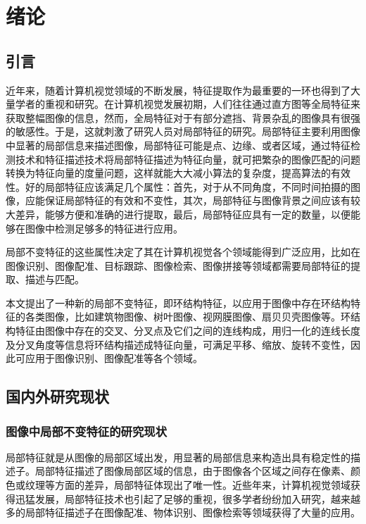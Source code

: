 

\chapter{绪论}
\label{cha:intro}


\section{引言}
\label{}

近年来，随着计算机视觉领域的不断发展，特征提取作为最重要的一环也得到了大量学者的重视和研究\cite{shipeng}。在计算机视觉发展初期，人们往往通过直方图等全局特征来获取整幅图像的信息\cite{liuying}，然而，全局特征对于有部分遮挡、背景杂乱的图像具有很强的敏感性。于是，这就刺激了研究人员对局部特征的研究。局部特征主要利用图像中显著的局部信息来描述图像，局部特征可能是点、边缘、或者区域，通过特征检测技术和特征描述技术将局部特征描述为特征向量，就可把繁杂的图像匹配的问题转换为特征向量的度量问题，这样就能大大减小算法的复杂度，提高算法的有效性。好的局部特征应该满足几个属性：首先，对于从不同角度，不同时间拍摄的图像，应能保证局部特征的有效和不变性，其次，局部特征与图像背景之间应该有较大差异，能够方便和准确的进行提取，最后，局部特征应具有一定的数量，以便能够在图像中检测足够多的特征进行应用。

局部不变特征的这些属性决定了其在计算机视觉各个领域能得到广泛应用，比如在图像识别、图像配准、目标跟踪、图像检索、图像拼接等领域都需要局部特征的提取、描述与匹配。

本文提出了一种新的局部不变特征，即环结构特征，以应用于图像中存在环结构特征的各类图像，比如建筑物图像、树叶图像、视网膜图像、扇贝贝壳图像等。环结构特征由图像中存在的交叉、分叉点及它们之间的连线构成，用归一化的连线长度及分叉角度等信息将环结构描述成特征向量，可满足平移、缩放、旋转不变性，因此可应用于图像识别、图像配准等各个领域。


\section{国内外研究现状}
\label{} 



\subsection{图像中局部不变特征的研究现状}
\label{}

局部特征就是从图像的局部区域出发，用显著的局部信息来构造出具有稳定性的描述子。局部特征描述了图像局部区域的信息，由于图像各个区域之间存在像素、颜色或纹理等方面的差异，局部特征体现出了唯一性。近些年来，计算机视觉领域获得迅猛发展，局部特征技术也引起了足够的重视，很多学者纷纷加入研究，越来越多的局部特征描述子在图像配准、物体识别、图像检索等领域获得了大量的应用。

